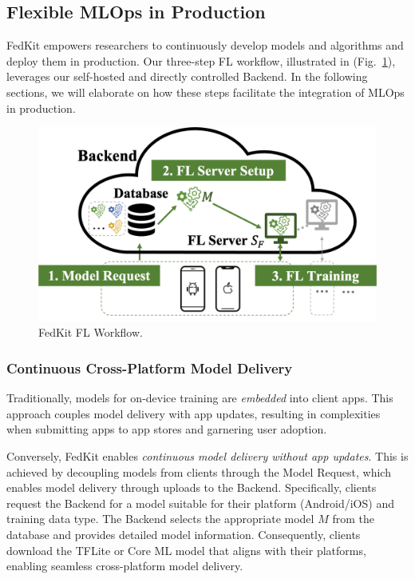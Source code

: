 \documentclass[letterpaper]{article} %
\begin{document}
\subsection{Flexible MLOps in Production}
\newcommand{\model}{$M$}
\newcommand{\fs}{$S_\mathrm F$}
FedKit empowers researchers to continuously develop models and algorithms and
deploy them in production.
Our three-step FL workflow, illustrated in (Fig.~\ref{fig:fl-workflow}),
leverages our self-hosted and directly controlled Backend.
In the following sections, we will elaborate on how these steps facilitate the integration of MLOps in production.
\begin{figure}
    \centering
    \includegraphics*[width=0.9\linewidth]{fl_workflow.png}
    \caption{FedKit FL Workflow.}
    \label{fig:fl-workflow}
\end{figure}

\subsubsection{Continuous Cross-Platform Model Delivery}
Traditionally, models for on-device training are \textit{embedded} into client apps.
This approach couples model delivery with app updates, 
resulting in complexities when submitting apps to app stores and garnering user adoption.


Conversely,
FedKit enables \textit{continuous model delivery without app updates}.
This is achieved by decoupling models from clients through the Model Request, which enables model delivery through uploads to the Backend.
Specifically, clients request the Backend for a model suitable for
their platform (Android/iOS) and training data type.
The Backend selects the appropriate model \model{} from the database and
provides detailed model information.
Consequently, clients download the TFLite or Core ML model that aligns with
their platforms,
enabling seamless cross-platform model delivery.
\end{document}
